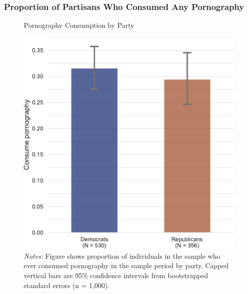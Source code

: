\documentclass[12pt, letterpaper]{article}
\begin{document}
\subsubsection{Proportion of Partisans Who Consumed Any Pornography}
\begin{figure}
	\centering
	\caption{Pornography Consumption by Party}
	\includegraphics[width=.5\textwidth]{../figs/consume_porn_yes_no.pdf}
	\caption*{\footnotesize \emph{Notes:} 
		Figure shows proportion of individuals in the sample who ever consumed pornography in the sample period by party.
		Capped vertical bars are 95\% confidence intervals from bootstrapped standard errors (n = 1,000).
	}
	\label{fig:consume_porn_yes_no}
\end{figure}
\clearpage

\FloatBarrier
\end{document}
